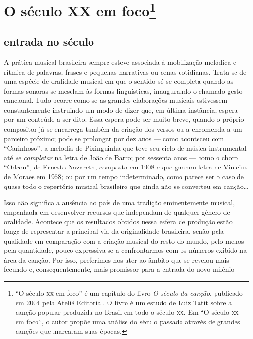 \chapter{O século XX em foco\footnote{``O século \textsc{xx} em foco'' é um capítulo do livro \textit{O século da canção}, publicado em 2004 pela Ateliê Editorial. O livro é um estudo de Luiz Tatit sobre a canção popular produzida no Brasil em todo o século \textsc{xx}. Em ``O século \textsc{xx} em foco'', o autor propõe uma análise do século passado através de grandes canções que marcaram suas épocas.}}

\section{entrada no século}

A prática musical brasileira sempre esteve associada à mobilização
melódica e rítmica de palavras, frases e pequenas narrativas ou cenas
cotidianas. Trata-se de uma espécie de oralidade musical em que o
sentido só se completa quando as formas sonoras se mesclam às formas
linguísticas, inaugurando o chamado gesto cancional. Tudo ocorre como se
as grandes elaborações musicais estivessem constantemente instruindo um
modo de dizer que, em última instância, espera por um conteúdo a ser
dito. Essa espera pode ser muito breve, quando o próprio compositor já
se encarrega também da criação dos versos ou a encomenda a um parceiro
próximo; pode se prolongar por dez anos --- como aconteceu com
``Carinhoso'', a melodia de Pixinguinha que teve seu ciclo de música
instrumental até \textit{se completar} na letra de João de Barro; por
sessenta anos --- como o choro ``Odeon'', de Ernesto Nazareth, composto
em 1908 e que ganhou letra de Vinicius de Moraes em 1968; ou por um
tempo indeterminado, como parece ser o caso de quase todo o repertório
musical brasileiro que ainda não se converteu em canção\ldots

Isso não significa a ausência no país de uma tradição eminentemente
musical, empenhada em desenvolver recursos que independam de qualquer
gênero de oralidade. Acontece que os resultados obtidos nessa esfera de
produção estão longe de representar a principal via da originalidade
brasileira, senão pela qualidade em comparação com a criação musical do
resto do mundo, pelo menos pela quantidade, pouco expressiva se a
confrontarmos com os números exibido na área da canção. Por isso,
preferimos nos ater ao âmbito que se revelou mais fecundo e,
consequentemente, mais promissor para a entrada do novo milênio.

